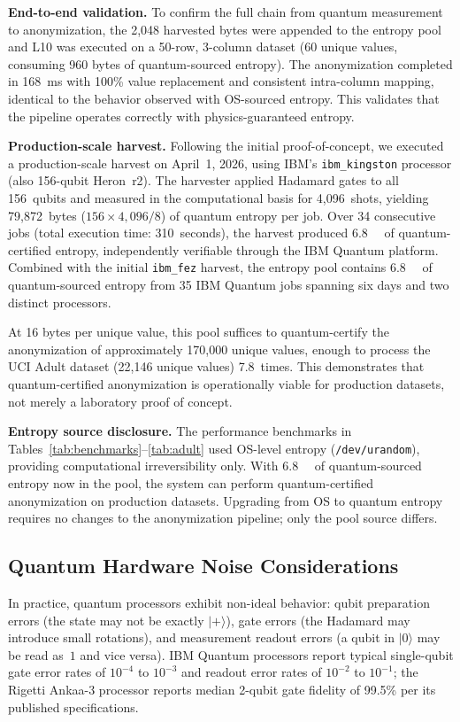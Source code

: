 \documentclass[journal]{IEEEtran}
\begin{document}
\textbf{End-to-end validation.} To confirm the full chain from quantum measurement to anonymization, the 2,048 harvested bytes were appended to the entropy pool and L10 was executed on a 50-row, 3-column dataset (60 unique values, consuming 960 bytes of quantum-sourced entropy). The anonymization completed in 168~ms with 100\% value replacement and consistent intra-column mapping, identical to the behavior observed with OS-sourced entropy. This validates that the pipeline operates correctly with physics-guaranteed entropy.

\textbf{Production-scale harvest.} Following the initial proof-of-concept, we executed a production-scale harvest on April~1, 2026, using IBM's \texttt{ibm\_kingston} processor (also 156-qubit Heron~r2). The harvester applied Hadamard gates to all 156~qubits and measured in the computational basis for 4,096~shots, yielding 79,872~bytes ($156 \times 4{,}096 / 8$) of quantum entropy per job. Over 34 consecutive jobs (total execution time: 310~seconds), the harvest produced \SI{6.8}{\mega\byte} of quantum-certified entropy, independently verifiable through the IBM Quantum platform. Combined with the initial \texttt{ibm\_fez} harvest, the entropy pool contains \SI{6.8}{\mega\byte} of quantum-sourced entropy from 35 IBM Quantum jobs spanning six days and two distinct processors.

At 16 bytes per unique value, this pool suffices to quantum-certify the anonymization of approximately 170,000 unique values, enough to process the UCI Adult dataset (22,146 unique values) 7.8~times. This demonstrates that quantum-certified anonymization is operationally viable for production datasets, not merely a laboratory proof of concept.

\textbf{Entropy source disclosure.} The performance benchmarks in Tables~\ref{tab:benchmarks}--\ref{tab:adult} used OS-level entropy (\texttt{/dev/urandom}), providing computational irreversibility only. With \SI{6.8}{\mega\byte} of quantum-sourced entropy now in the pool, the system can perform quantum-certified anonymization on production datasets. Upgrading from OS to quantum entropy requires no changes to the anonymization pipeline; only the pool source differs.

\subsection{Quantum Hardware Noise Considerations}

In practice, quantum processors exhibit non-ideal behavior: qubit preparation errors (the state may not be exactly $|{+}\rangle$), gate errors (the Hadamard may introduce small rotations), and measurement readout errors (a qubit in $|0\rangle$ may be read as~$1$ and vice versa). IBM Quantum processors report typical single-qubit gate error rates of $10^{-4}$ to $10^{-3}$ and readout error rates of $10^{-2}$ to $10^{-1}$; the Rigetti Ankaa-3 processor reports median 2-qubit gate fidelity of 99.5\% per its published specifications.
\end{document}

